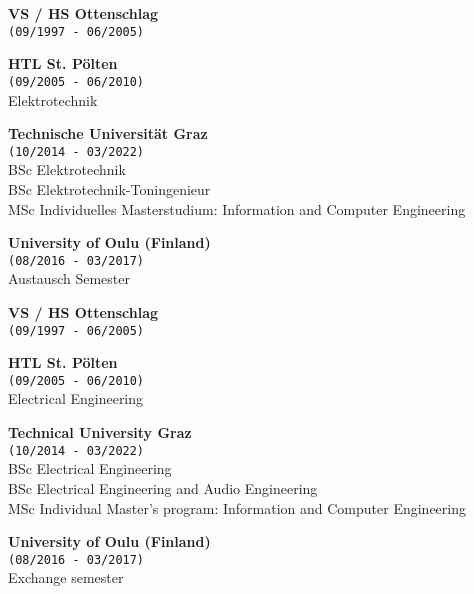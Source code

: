 
{


\textbf{VS / HS Ottenschlag}\\
\texttt{(09/1997 - 06/2005)}



\textbf{HTL St. Pölten}\\
\texttt{(09/2005 - 06/2010)}\\
Elektrotechnik

\textbf{Technische Universität Graz}\\
\texttt{(10/2014 - 03/2022)}\\
BSc Elektrotechnik\\
BSc Elektrotechnik-Toningenieur\\
MSc Individuelles Masterstudium: Information and Computer Engineering

\textbf{University of Oulu (Finland)}\\
\texttt{(08/2016 - 03/2017)}\\
Austausch Semester\\
}
{


\textbf{VS / HS Ottenschlag}\\
\texttt{(09/1997 - 06/2005)}



\textbf{HTL St. Pölten}\\
\texttt{(09/2005 - 06/2010)}\\
Electrical Engineering

\textbf{Technical University Graz}\\
\texttt{(10/2014 - 03/2022)}\\
BSc Electrical Engineering\\
BSc Electrical Engineering and Audio Engineering\\
MSc Individual Master's program: Information and Computer Engineering

\textbf{University of Oulu (Finland)}\\
\texttt{(08/2016 - 03/2017)}\\
Exchange semester\\
}
